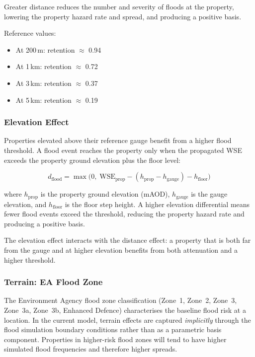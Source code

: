 \documentclass[11pt,a4paper]{article}
\begin{document}
Greater distance reduces the number and severity of floods at the property, lowering
the property hazard rate and spread, and producing a positive basis.

Reference values:
\begin{itemize}[nosep]
    \item At 200\,m: retention $\approx$ 0.94
    \item At 1\,km: retention $\approx$ 0.72
    \item At 3\,km: retention $\approx$ 0.37
    \item At 5\,km: retention $\approx$ 0.19
\end{itemize}

\subsubsection{Elevation Effect}

Properties elevated above their reference gauge benefit from a higher flood threshold.
A flood event reaches the property only when the propagated WSE exceeds the property
ground elevation plus the floor level:

\begin{equation}
    d_{\text{flood}} = \max\!\big(0,\; \text{WSE}_{\text{prop}} - (h_{\text{prop}} - h_{\text{gauge}}) - h_{\text{floor}}\big)
    \label{eq:flood_depth}
\end{equation}

\noindent where $h_{\text{prop}}$ is the property ground elevation (mAOD),
$h_{\text{gauge}}$ is the gauge elevation, and $h_{\text{floor}}$ is the floor step
height. A higher elevation differential means fewer flood events exceed the threshold,
reducing the property hazard rate and producing a positive basis.

The elevation effect interacts with the distance effect: a property that is both far
from the gauge and at higher elevation benefits from both attenuation and a higher
threshold.

\subsubsection{Terrain: EA Flood Zone}

The Environment Agency flood zone classification (Zone~1, Zone~2, Zone~3, Zone~3a,
Zone~3b, Enhanced Defence) characterises the baseline flood risk at a location. In the
current model, terrain effects are captured \emph{implicitly} through the flood
simulation boundary conditions rather than as a parametric basis component. Properties
in higher-risk flood zones will tend to have higher simulated flood frequencies and
therefore higher spreads.
\end{document}
